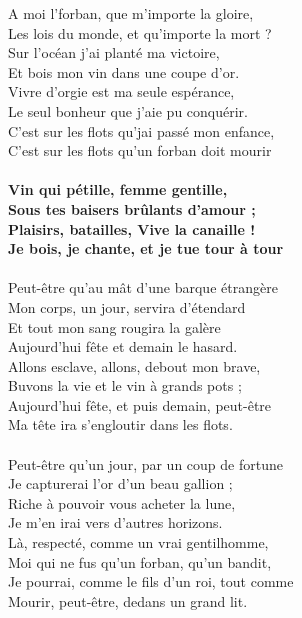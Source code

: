A moi l'forban, que m'importe la gloire,\\
Les lois du monde, et qu'importe la mort ? \\
Sur l'océan j'ai planté ma victoire,\\
Et bois mon vin dans une coupe d'or. \\
Vivre d'orgie est ma seule espérance, \\
Le seul bonheur que j'aie pu conquérir. \\
C'est sur les flots qu'jai passé mon enfance, \\
C'est sur les flots qu'un forban doit mourir\\
~\\
\textbf{Vin qui pétille, femme gentille, \\
Sous tes baisers brûlants d'amour ; \\
Plaisirs, batailles, Vive la canaille ! \\
Je bois, je chante, et je tue tour à tour\\}
~\\
Peut-être qu'au mât d'une barque étrangère\\
Mon corps, un jour, servira d'étendard\\
Et tout mon sang rougira la galère\\
Aujourd'hui fête et demain le hasard. \\
Allons esclave, allons, debout mon brave,\\
Buvons la vie et le vin à grands pots ; \\
Aujourd'hui fête, et puis demain, peut-être \\
Ma tête ira s'engloutir dans les flots.\\
~\\
Peut-être qu'un jour, par un coup de fortune \\
Je capturerai l'or d'un beau gallion ;\\
Riche à pouvoir vous acheter la lune, \\
Je m'en irai vers d'autres horizons. \\
Là, respecté, comme un vrai gentilhomme, \\
Moi qui ne fus qu'un forban, qu'un bandit, \\
Je pourrai, comme le fils d'un roi, tout comme \\
Mourir, peut-être, dedans un grand lit.\\
~\\
